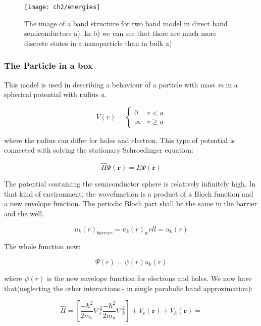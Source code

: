 \begin{figure}
\centering
\texttt{[image: ch2/energies]}
\caption{The image of a band structure for two band model in direct band semiconductors a). In b) we can see that there are much more discrete states in a nanoparticle than in bulk a) \cite{Klimov}}
\end{figure}


\subsubsection{The Particle in a box}

This model is used in describing a behaviour of a particle with mass \textit{m} in a spherical potential with radius \textit{a}. \cite{Klimov} 

\[ V(r) = 
 \begin{cases}
 0  & r < a \\
 \infty & r \geq a
 \end{cases}
\]

where the radius can differ for holes and electron. This type of potential is connected with solving the stationary Schroedinger equation:

\begin{equation}
\hat{H}\Psi (\mathbf{r}) =  E\Psi (\mathbf{r})
\end{equation}

The potential containing the semiconductor sphere is relatively infinitely high. In that kind of environment, the wavefunction is a product of a Bloch function and a new envelope function. The periodic Bloch part shall be the same in the barrier and the well. 

\begin{equation}
u_k(r)_{barrier} = u_k(r)_well = u_k(r)
\end{equation}

The whole function now:

\begin{equation}
\Psi (r) = \psi (r) u_k(r)
\end{equation}

where $\psi(r)$ is the new envelope function for electrons and holes. We now have that(neglecting the other interactions - in single parabolic band approximation):

\begin{equation}
\hat{H} = \left[ \frac{-\hbar ^2}{2m_e}\nabla _e^2 \frac{-\hbar ^2}{2m_h}\nabla _h^2 \right] + V_e(\mathbf{r}) + V_h(\mathbf{r}) =
\end{equation}


